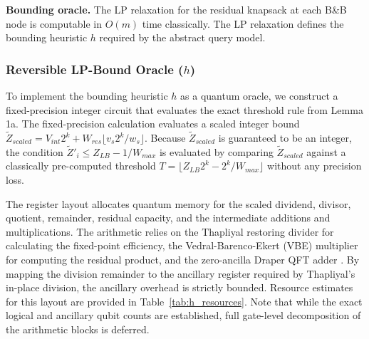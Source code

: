 \documentclass[conference]{IEEEtran}
\begin{document}
\textbf{Bounding oracle.} The LP relaxation for the residual knapsack at each B\&B node is computable in $O(m)$ time classically. The LP relaxation defines the bounding heuristic $h$ required by the abstract query model.

\subsubsection{Reversible LP-Bound Oracle ($h$)}

To implement the bounding heuristic $h$ as a quantum oracle, we construct a fixed-precision integer circuit that evaluates the exact threshold rule from Lemma 1a. The fixed-precision calculation evaluates a scaled integer bound $\tilde{Z}_{scaled} = V_{int} 2^k + W_{res} \lfloor v_s 2^k / w_s \rfloor$. Because $\tilde{Z}_{scaled}$ is guaranteed to be an integer, the condition $\tilde{Z}'_i \le Z_{LB} - 1/W_{max}$ is evaluated by comparing $\tilde{Z}_{scaled}$ against a classically pre-computed threshold $T = \lfloor Z_{LB} 2^k - 2^k/W_{max} \rfloor$ without any precision loss.

The register layout allocates quantum memory for the scaled dividend, divisor, quotient, remainder, residual capacity, and the intermediate additions and multiplications. The arithmetic relies on the Thapliyal restoring divider \cite{thapliyal2016} for calculating the fixed-point efficiency, the Vedral-Barenco-Ekert (VBE) multiplier \cite{vedral1996} for computing the residual product, and the zero-ancilla Draper QFT adder \cite{draper2000}. By mapping the division remainder to the ancillary register required by Thapliyal's in-place division, the ancillary overhead is strictly bounded. Resource estimates for this layout are provided in Table~\ref{tab:h_resources}. Note that while the exact logical and ancillary qubit counts are established, full gate-level decomposition of the arithmetic blocks is deferred.
\end{document}

